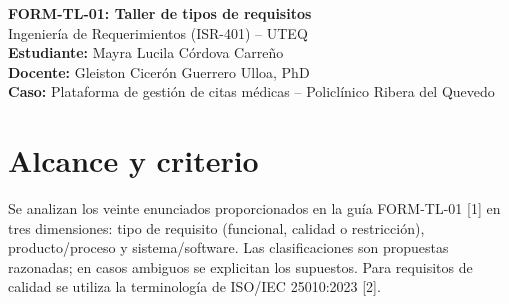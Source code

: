 \documentclass[11pt,a4paper]{article}
\begin{document}
\begin{center}
{\Large\bfseries FORM-TL-01: Taller de tipos de requisitos}\\[5pt]
Ingeniería de Requerimientos (ISR-401) -- UTEQ\\
\textbf{Estudiante:} Mayra Lucila Córdova Carreño\\
\textbf{Docente:} Gleiston Cicerón Guerrero Ulloa, PhD\\
\textbf{Caso:} Plataforma de gestión de citas médicas -- Policlínico Ribera del Quevedo
\end{center}
\section{Alcance y criterio}
Se analizan los veinte enunciados proporcionados en la guía FORM-TL-01 [1] en tres dimensiones: tipo de requisito (funcional, calidad o restricción), producto/proceso y sistema/software. Las clasificaciones son propuestas razonadas; en casos ambiguos se explicitan los supuestos. Para requisitos de calidad se utiliza la terminología de ISO/IEC 25010:2023 [2].
\end{document}
